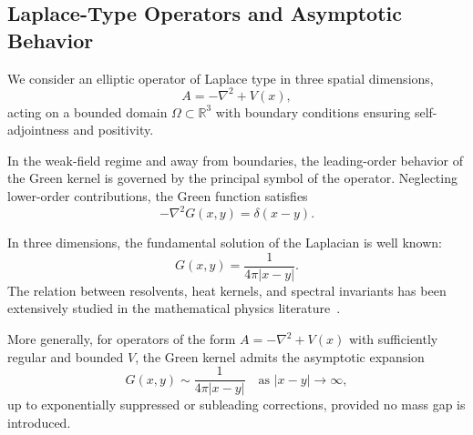 \subsection{Laplace-Type Operators and Asymptotic Behavior}
  \label{subsec:laplace-type-operators}

  We consider an elliptic operator of Laplace type in three spatial dimensions,
  \begin{equation}
    A = -\nabla^2 + V(x),
  \end{equation}
  acting on a bounded domain $\Omega \subset \mathbb{R}^3$
  with boundary conditions ensuring self-adjointness and positivity.

  In the weak-field regime and away from boundaries,
  the leading-order behavior of the Green kernel is governed
  by the principal symbol of the operator.
  Neglecting lower-order contributions, the Green function satisfies
  \begin{equation}
    -\nabla^2 G(x,y) = \delta(x-y).
  \end{equation}

  In three dimensions, the fundamental solution of the Laplacian
  is well known:
  \begin{equation}
    G(x,y) = \frac{1}{4\pi |x-y|}.
  \end{equation}
  The relation between resolvents, heat kernels, and spectral
  invariants has been extensively studied in the mathematical
  physics literature~\cite{gilkey1995,vassilevich2003}.

  More generally, for operators of the form $A = -\nabla^2 + V(x)$
  with sufficiently regular and bounded $V$,
  the Green kernel admits the asymptotic expansion
  \begin{equation}
    G(x,y) \sim \frac{1}{4\pi |x-y|}
    \quad \text{as } |x-y| \to \infty,
  \end{equation}
  up to exponentially suppressed or subleading corrections,
  provided no mass gap is introduced.
